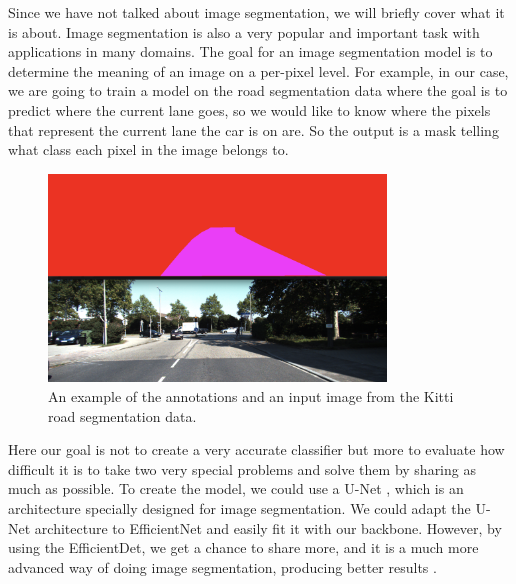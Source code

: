 Since we have not talked about image segmentation, we will briefly cover what it is about.
Image segmentation is also a very popular and important task with applications in many domains.
The goal for an image segmentation model is to determine the meaning of an image on a per-pixel level.
For example, in our case, we are going to train a model on the road segmentation data where the goal is to predict where the current lane goes, so we would like to know where the pixels that represent the current lane the car is on are.
So the output is a mask telling what class each pixel in the image belongs to.

\begin{figure}[h!] 
\centering 
\includegraphics[width=0.8\textwidth]{imgs/segmentation-example.png}
\caption{An example of the annotations and an input image from the Kitti \citep{kitti} road segmentation data.}
\end{figure}

Here our goal is not to create a very accurate classifier but more to evaluate how difficult it is to take two very special problems and solve them by sharing as much as possible.
To create the model, we could use a U-Net \citep{unet}, which is an architecture specially designed for image segmentation.
We could adapt the U-Net architecture to EfficientNet and easily fit it with our backbone.
However, by using the EfficientDet, we get a chance to share more, and it is a much more advanced way of doing image segmentation, producing better results \citep{efficientDet}.


